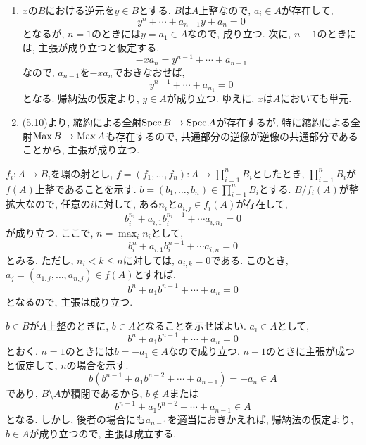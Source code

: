 \documentclass[dvipdfmx]{jsarticle}
\begin{document}
    \begin{problem}
        \begin{enumerate}
            \item  $x$の$B$における逆元を$y \in B$とする.
            $B$は$A$上整なので, $a_i \in A$が存在して,
            \[
                y^n + \cdots + a_{n-1}y + a_n = 0
            \]
            となるが, $n = 1$のときには$y = a_1 \in A$なので, 成り立つ.
            次に, $n-1$のときには, 主張が成り立つと仮定する.
            \[
                -xa_n = y^{n-1} + \cdots + a_{n-1}
            \]
            なので, $a_{n-1}$を$-xa_n$でおきなおせば,
            \[
                y^{n-1} + \cdots + a_{n_1} = 0
            \]
            となる.
            帰納法の仮定より, $y \in A$が成り立つ.
            ゆえに, $x$は$A$においても単元.
            \item (5.10)より, 縮約による全射$\operatorname{Spec}{B} \to \operatorname{Spec}{A}$が存在するが,
            特に縮約による全射$\operatorname{Max}{B} \to \operatorname{Max}{A}$も存在するので, 共通部分の逆像が逆像の共通部分であることから, 主張が成り立つ.
        \end{enumerate}
    \end{problem}

    \begin{problem}
        $f_i: A \to B_i$を環の射とし, $f = (f_1, \dots, f_n): A \to \prod_{i = 1}^n B_i$としたとき,
        $\prod_{i = 1}^n B_i$が$f(A)$上整であることを示す.
        $b = (b_1, \dots, b_n) \in \prod_{i = 1}^n B_i$とする.
        $B/f_i(A)$が整拡大なので,
        任意の$i$に対して, ある$n_i$と$a_{i,j} \in f_i(A)$が存在して,
        \[
            b_i^{n_i} + a_{i,1}b_i^{n_i-1} + \cdots a_{i,n_1} = 0
        \]
        が成り立つ.
        ここで, $n = \max_i{n_i}$として,
        \[
            b_i^{n} + a_{i,1}b_i^{n-1} + \cdots a_{i,n} = 0
        \]
        とみる.
        ただし, $n_i < k \leq n$に対しては, $a_{i,k} = 0$である.
        このとき, $a_j = (a_{1,j}, \dots, a_{n,j}) \in f(A)$とすれば,
        \[
            b^n+ a_1 b^{n-1} + \cdots + a_n = 0
        \]
        となるので, 主張は成り立つ.
    \end{problem}

    \begin{problem}
        $b \in B$が$A$上整のときに, $b \in A$となることを示せばよい.
        $a_i \in A$として,
        \[
            b^n + a_1b^{n-1} + \cdots + a_n = 0
        \]
        とおく.
        $n = 1$のときには$b = -a_1 \in A$なので成り立つ.
        $n-1$のときに主張が成つと仮定して, $n$の場合を示す.
        \[
            b(b^{n-1} + a_1b^{n-2} + \cdots + a_{n-1}) = -a_n \in A
        \]
        であり,
        $B \setminus A$が積閉であるから, $b \notin A$または
        \[
            b^{n-1} + a_1b^{n-2} + \cdots + a_{n-1} \in A
        \]
        となる.
        しかし, 後者の場合にも$a_{n-1}$を適当におきかえれば, 帰納法の仮定より, $b \in A$が成り立つので,
        主張は成立する.
    \end{problem}
\end{document}
